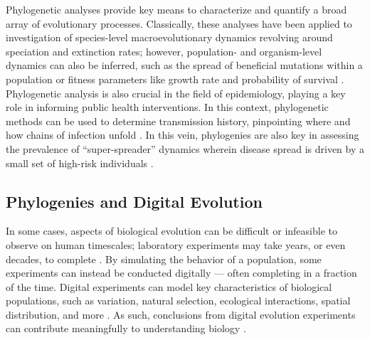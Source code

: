 Phylogenetic analyses provide key means to characterize and quantify a broad array of evolutionary processes.
Classically, these analyses have been applied to investigation of species-level macroevolutionary dynamics revolving around speciation and extinction rates; however, population- and organism-level dynamics can also be inferred, such as the spread of beneficial mutations within a population or fitness parameters like growth rate and probability of survival \citep{genthon2023cell, levy2015quantitative, stadler2013recovering}.
Phylogenetic analysis is also crucial in the field of epidemiology, playing a key role in informing public health interventions.
In this context, phylogenetic methods can be used to determine transmission history, pinpointing where and how chains of infection unfold \citep{wang2020role}.
In this vein, phylogenies are also key in assessing the prevalence of  ``super-spreader'' dynamics wherein disease spread is driven by a small set of high-risk individuals \citep{colijn2014phylogenetic}.



\subsection{Phylogenies and Digital Evolution} \label{sec:introduction:digital}

In some cases, aspects of biological evolution can be difficult or infeasible to observe on human timescales; laboratory experiments may take years, or even decades, to complete \citep{wiser2013long,Stroud2025}.
By simulating the behavior of a population, some experiments can instead be conducted digitally --- often completing in a fraction of the time.
Digital experiments can model key characteristics of biological populations, such as variation, natural selection, ecological interactions, spatial distribution, and more \citep{dolson2021digital,haller2023slim}.
As such, conclusions from digital evolution experiments can contribute meaningfully to understanding biology \citep{pennock2007models}.

